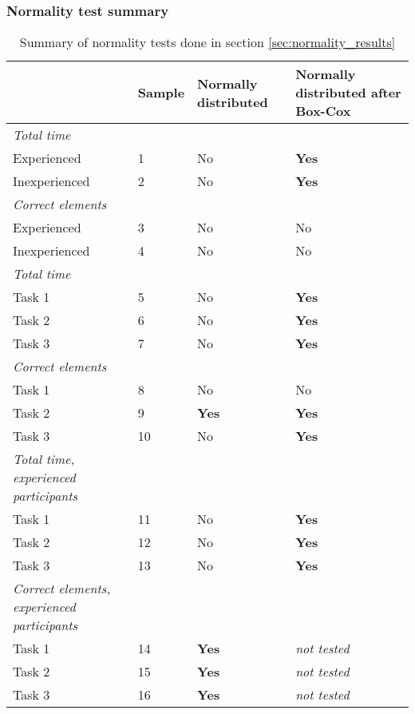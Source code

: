 \subsubsection{Normality test summary}\label{sec:normaltest_summary}

	\begin{longtable}{p{}|l|p{2cm}|p{}}
	\caption[Summary, normality tests]{Summary of normality tests done in section \ref{sec:normality_results}} \label{tab:normaltest_summary} \\
		  & Sample & Normally distributed  & Normally distributed after Box-Cox  \\ \hline
		\textit{Total time} & & & \\
		Experienced & 1 &No   & \textbf{Yes}   \\
		Inexperienced  & 2 & No & \textbf{Yes}     \\ \hline
		\textit{Correct elements} & & & \\
		Experienced & 3 & No  & No   \\
		Inexperienced  & 4 & No & No   \\ \hline
		\textit{Total time }& & & \\
		Task 1 & 5 &No  & \textbf{Yes}  \\
		Task 2 & 6 &No  & \textbf{Yes}   \\
		Task 3 & 7 & No & \textbf{Yes}  \\ \hline
		\textit{Correct elements} & & & \\
		Task 1 & 8 & No  & No  \\
		Task 2 & 9 &\textbf{Yes}  & \textbf{Yes}   \\
		Task 3 & 10 & No & \textbf{Yes}  \\ \hline
		\textit{Total time, experienced participants} & & & \\
		Task 1 & 11 & No  & \textbf{Yes}  \\
		Task 2 & 12 & No  & \textbf{Yes}   \\
		Task 3 & 13 & No & \textbf{Yes}  \\ \hline
		\textit{Correct elements, experienced participants} & & & \\
		Task 1 & 14 & \textbf{Yes}  & \textit{not tested} \\
		Task 2 & 15 & \textbf{Yes}  &  \textit{not tested} \\
		Task 3 & 16 & \textbf{Yes} & \textit{not tested} \\ \hline
	\end{longtable}

